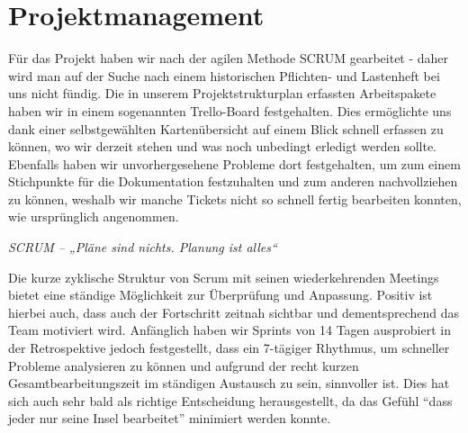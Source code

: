 \section{Projektmanagement}


Für das Projekt haben wir nach der agilen Methode SCRUM gearbeitet - daher wird man auf der Suche nach einem historischen Pflichten- und Lastenheft bei uns nicht fündig. Die in unserem Projektstrukturplan erfassten Arbeitspakete haben wir in einem sogenannten Trello-Board festgehalten. Dies ermöglichte uns dank einer selbstgewählten Kartenübersicht auf einem Blick schnell erfassen zu können, wo wir derzeit stehen und was noch unbedingt erledigt werden sollte. Ebenfalls haben wir unvorhergesehene Probleme dort festgehalten, um zum einem Stichpunkte für die Dokumentation festzuhalten und zum anderen nachvollziehen zu  können, weshalb wir manche Tickets  nicht so schnell fertig bearbeiten konnten, wie ursprünglich angenommen. 
\begin{center}
	\textit{SCRUM – „Pläne sind nichts. Planung ist alles“}
\end{center}
Die kurze zyklische Struktur von Scrum mit seinen wiederkehrenden Meetings bietet eine ständige Möglichkeit zur Überprüfung und Anpassung. Positiv ist hierbei auch, dass auch der Fortschritt zeitnah sichtbar und dementsprechend das Team motiviert wird. Anfänglich haben wir Sprints von 14 Tagen ausprobiert in der Retrospektive jedoch festgestellt, dass ein  7-tägiger Rhythmus, um schneller Probleme analysieren zu können und aufgrund der recht kurzen Gesamtbearbeitungszeit im ständigen Austausch zu sein, sinnvoller ist. Dies hat sich auch sehr bald als richtige Entscheidung herausgestellt, da das Gefühl “dass jeder nur seine Insel bearbeitet” minimiert werden konnte.

